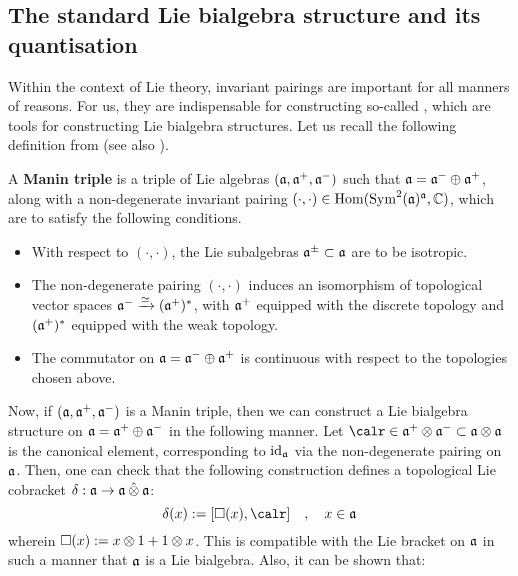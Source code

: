     \subsection{The standard Lie bialgebra structure and its quantisation}
        Within the context of Lie theory, invariant pairings are important for all manners of reasons. For us, they are indispensable for constructing so-called , which are tools for constructing Lie bialgebra structures. Let us recall the following definition from \cite[Subsection 2.6]{appel_laredo_2_categorical_etingof_kazhdan_quantisation} (see also \cite[Subsection 7.4]{etingof_kazhdan_quantisation_1}).
        \begin{definition} \label{def: manin_triples}
            A \textbf{Manin triple} is a triple of Lie algebras $(\mathfrak{a}, \mathfrak{a}^+, \mathfrak{a}^-)$ such that $\mathfrak{a} = \mathfrak{a}^- \oplus \mathfrak{a}^+$, along with a non-degenerate invariant pairing $(\cdot, \cdot) \in \operatorname{Hom}( \operatorname{Sym}^2(\mathfrak{a})^{\mathfrak{a}}, \mathbb{C} )$, which are to satisfy the following conditions.
            \begin{itemize}
                \item With respect to $(\cdot, \cdot)$, the Lie subalgebras $\mathfrak{a}^{\pm} \subset \mathfrak{a}$ are to be isotropic. 
                \item The non-degenerate pairing $(\cdot, \cdot)$ induces an isomorphism of topological vector spaces $\mathfrak{a}^- \xrightarrow[]{\simeq} (\mathfrak{a}^+)^*$, with $\mathfrak{a}^+$ equipped with the discrete topology and $(\mathfrak{a}^+)^*$ equipped with the weak topology.
                \item The commutator on $\mathfrak{a} = \mathfrak{a}^- \oplus \mathfrak{a}^+$ is continuous with respect to the topologies chosen above. 
            \end{itemize}
        \end{definition}
        Now, if $(\mathfrak{a}, \mathfrak{a}^+, \mathfrak{a}^-)$ is a Manin triple, then we can construct a Lie bialgebra structure on $\mathfrak{a} = \mathfrak{a}^+ \oplus \mathfrak{a}^-$ in the following manner. Let $\calr \in \a^+ \tensor \a^- \subset \a \tensor \a$ is the canonical element, corresponding to $\mathrm{id}_{\mathfrak{a}}$ via the non-degenerate pairing on $\mathfrak{a}$. Then, one can check that the following construction defines a topological Lie cobracket $\delta: \a \to \a \hattensor \a$:
            \begin{equation}
                \delta(x) := [\Box(x), \calr] \quad, \quad x \in \a
            \end{equation}
        wherein $\Box(x) := x \tensor 1 + 1 \tensor x$. This is compatible with the Lie bracket on $\mathfrak{a}$ in such a manner that $\mathfrak{a}$ is a Lie bialgebra. Also, it can be shown that:
